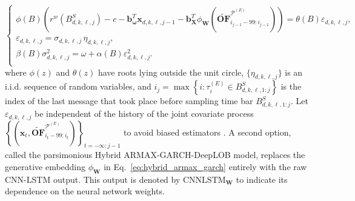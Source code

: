 \documentclass[10pt,a4paper,oneside]{article}
\begin{document}
\begin{equation}
    \begin{cases}
        \phi(B) \left( r^w \left( B^S_{d, k, \ell, j} \right) - c - \mathbf{b}_{\boldsymbol{\omega}}^T \mathbf{x}_{d, k, \ell, j - 1} - \mathbf{b}^T_{\mathbf{X}}\phi_{\mathbf{W}} \left( \widetilde{\mathbf{OF}}^{\mathcal{P}^{(E)}}_{i_{j - 1} - 99:i_{j - 1}} \right) \right) = \theta(B) \varepsilon_{d, k, \ell, j}, \\[6pt]
        \varepsilon_{d, k, \ell, j} = \sigma_{d, k, \ell, j} \,\eta_{d, k, \ell, j},                                                                                                                                                                                                                                      \\[6pt]
        \beta(B) \sigma_{d, k, \ell, j}^2 = \omega + \alpha(B) \varepsilon^2_{d, k, \ell, j}.                                                                                                                                                                                                                             \\
    \end{cases}
    \label{eq:hybrid_armax_garch}
\end{equation}
where \(\phi(z)\) and \(\theta(z)\) have roots lying outside the unit circle, \(\{\eta_{d, k, \ell, j}\}\) is an i.i.d. sequence of random variables, and $i_j = \max\left\{i : \tau^{(E)}_{i} \in B^S_{d, k, \ell, 1:j} \right\}$ is the index of the last message that took place before sampling time bar $B^S_{d, k, \ell, 1:j}$. Let \(\varepsilon_{d, k, \ell, j}\) be independent of the history of the joint covariate process \( \left\{ \left( \mathbf{x}_t, \widetilde{\mathbf{OF}}^{\mathcal{P}^{(E)}}_{i_{t} - 99:i_{t}} \right) \right\}_{t = -\infty : j - 1}\) to avoid biased estimators \citep[Ch.~9]{hamilton_time_1994}. A second option, called the parsimonious Hybrid ARMAX-GARCH-DeepLOB model, replaces the generative embedding $\phi_{\mathbf{W}}$ in Eq.~\eqref{eq:hybrid_armax_garch} entirely with the raw CNN-LSTM output. This output is denoted by $\mathrm{CNNLSTM}_{\mathbf{W}}$ to indicate its dependence on the neural network weights.

\end{document}
